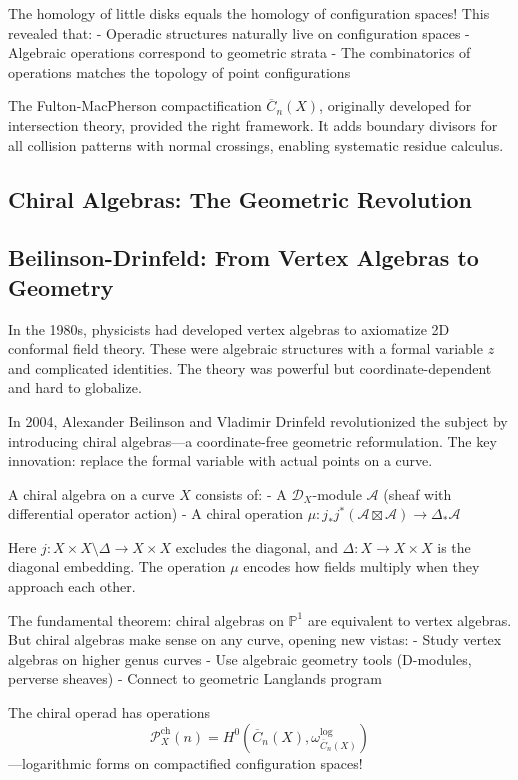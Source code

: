 The homology of little disks equals the homology of configuration spaces! This revealed that:
- Operadic structures naturally live on configuration spaces
- Algebraic operations correspond to geometric strata
- The combinatorics of operations matches the topology of point configurations

The Fulton-MacPherson compactification $\overline{C}_n(X)$, originally developed for intersection theory, provided the right framework. It adds boundary divisors for all collision patterns with normal crossings, enabling systematic residue calculus.

\subsection{Chiral Algebras: The Geometric Revolution}

\subsection{Beilinson-Drinfeld: From Vertex Algebras to Geometry}

In the 1980s, physicists had developed vertex algebras to axiomatize 2D conformal field theory. These were algebraic structures with a formal variable $z$ and complicated identities. The theory was powerful but coordinate-dependent and hard to globalize.

In 2004, Alexander Beilinson and Vladimir Drinfeld \cite{BD04} revolutionized the subject by introducing chiral algebras—a coordinate-free geometric reformulation. The key innovation: replace the formal variable with actual points on a curve.

A chiral algebra on a curve $X$ consists of:
- A $\mathcal{D}_X$-module $\mathcal{A}$ (sheaf with differential operator action)
- A chiral operation $\mu: j_*j^*(\mathcal{A} \boxtimes \mathcal{A}) \to \Delta_*\mathcal{A}$

Here $j: X \times X \setminus \Delta \to X \times X$ excludes the diagonal, and $\Delta: X \to X \times X$ is the diagonal embedding. The operation $\mu$ encodes how fields multiply when they approach each other.

The fundamental theorem: chiral algebras on $\mathbb{P}^1$ are equivalent to vertex algebras. But chiral algebras make sense on any curve, opening new vistas:
- Study vertex algebras on higher genus curves
- Use algebraic geometry tools (D-modules, perverse sheaves)
- Connect to geometric Langlands program

The chiral operad has operations
$$\mathcal{P}^{\text{ch}}_X(n) = H^0(\overline{C}_n(X), \omega_{\overline{C}_n(X)}^{\text{log}})$$
—logarithmic forms on compactified configuration spaces!

